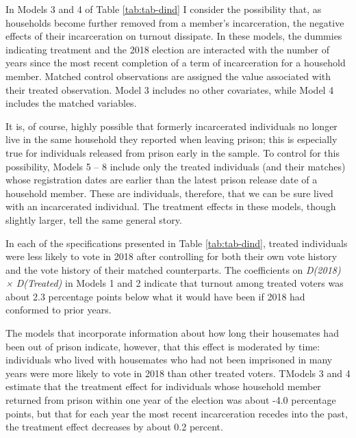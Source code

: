 \documentclass[
  12pt,
]{article}
\begin{document}
In Models 3 and 4 of Table \ref{tab:tab-dind} I consider the possibility that, as households become further removed from a member's incarceration, the negative effects of their incarceration on turnout dissipate. In these models, the dummies indicating treatment and the 2018 election are interacted with the number of years since the most recent completion of a term of incarceration for a household member. Matched control observations are assigned the value associated with their treated observation. Model 3 includes no other covariates, while Model 4 includes the matched variables.

It is, of course, highly possible that formerly incarcerated individuals no longer live in the same household they reported when leaving prison; this is especially true for individuals released from prison early in the sample. To control for this possibility, Models 5 -- 8 include only the treated individuals (and their matches) whose registration dates are earlier than the latest prison release date of a household member. These are individuals, therefore, that we can be sure lived with an incarcerated individual. The treatment effects in these models, though slightly larger, tell the same general story.

\begin{singlespace}

\end{singlespace}

In each of the specifications presented in Table \ref{tab:tab-dind}, treated individuals were less likely to vote in 2018 after controlling for both their own vote history and the vote history of their matched counterparts. The coefficients on \emph{D(2018) × D(Treated)} in Models 1 and 2 indicate that turnout among treated voters was about 2.3 percentage points below what it would have been if 2018 had conformed to prior years.

The models that incorporate information about how long their housemates had been out of prison indicate, however, that this effect is moderated by time: individuals who lived with housemates who had not been imprisoned in many years were more likely to vote in 2018 than other treated voters. TModels 3 and 4 estimate that the treatment effect for individuals whose household member returned from prison within one year of the election was about -4.0 percentage points, but that for each year the most recent incarceration recedes into the past, the treatment effect decreases by about 0.2 percent.
\end{document}

